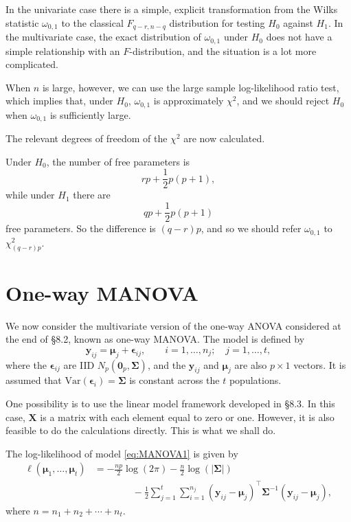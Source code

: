 \documentclass[]{book}
\theoremstyle{definition}
\theoremstyle{definition}
\theoremstyle{definition}
\theoremstyle{remark}
\begin{document}
In the univariate case there is a simple, explicit transformation from the Wilks statistic \(\omega_{0,1}\) to the classical \(F_{q-r,n-q}\) distribution for testing \(H_0\) against \(H_1\). In the multivariate case, the exact distribution of \(\omega_{0,1}\) under \(H_0\) does not have a simple relationship with an \(F\)-distribution, and the situation is a lot more complicated.

When \(n\) is large, however, we can use the large sample log-likelihood ratio test, which implies that, under \(H_0\),
\(\omega_{0,1}\) is approximately \(\chi^2\), and we should reject \(H_0\) when \(\omega_{0,1}\) is sufficiently large.

The relevant degrees of freedom of the \(\chi^2\) are now calculated.

Under \(H_0\), the number of free parameters is
\[
rp + \frac{1}{2}p(p+1),
\]
while under \(H_1\) there are
\[
qp +\frac{1}{2}p(p+1)
\]
free parameters. So the difference is \((q-r)p\), and so we should refer \(\omega_{0,1}\) to \(\chi_{(q-r)p}^2\).

\hypertarget{one-way-manova}{%
\section{One-way MANOVA}\label{one-way-manova}}

We now consider the multivariate version of the one-way ANOVA considered at the end of \S 8.2, known as one-way MANOVA. The model is defined by
\begin{equation}
 \boldsymbol y_{ij} = \boldsymbol \mu_j + {\pmb \epsilon}_{ij}, \qquad  i=1, \ldots , n_j; \quad j=1, \ldots, t,
 \label{eq:MANOVA1}
 \end{equation}
where the \({\pmb \epsilon}_{ij}\) are IID \(N_p({\mathbf 0}_p, \boldsymbol \Sigma)\), and the \(\boldsymbol y_{ij}\) and \(\boldsymbol \mu_j\) are also
\(p \times 1\) vectors. It is assumed that \(\text{Var}({\pmb \epsilon}_i)=\boldsymbol \Sigma\) is constant across the \(t\) populations.

One possibility is to use the linear model framework developed in \S 8.3. In this case, \(\boldsymbol X\) is a matrix with each element equal to zero or one. However, it is also feasible to do the calculations directly. This is what we shall do.

The log-likelihood of model \eqref{eq:MANOVA1} is given by
\begin{align}
 \ell(\boldsymbol \mu_1, \ldots , \boldsymbol \mu_t)&=-\frac{np}{2}\log(2\pi)-\frac{n}{2}\log(\vert \boldsymbol \Sigma\vert)\nonumber\\
 & \qquad \qquad -\frac{1}{2}\sum_{j=1}^t \sum_{i=1}^{n_j}
 (\boldsymbol y_{ij}-\boldsymbol \mu_j)^\top \boldsymbol \Sigma^{-1} (\boldsymbol y_{ij}-\boldsymbol \mu_j),
 \label{eq:MANOVAlik}
 \end{align}
where \(n=n_1 + n_2 +\cdots + n_t\).
\end{document}
